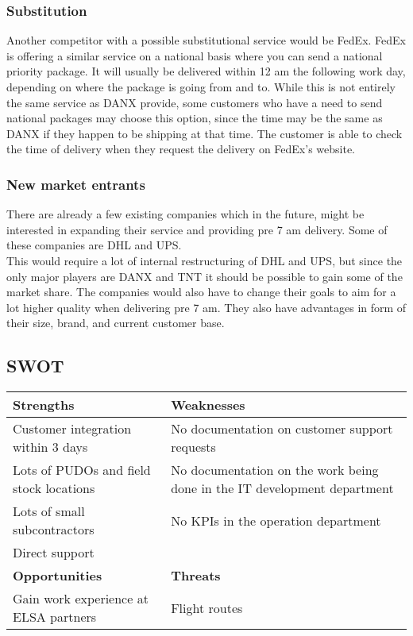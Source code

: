 \subsubsection{Substitution}
Another competitor with a possible substitutional service would be FedEx\cite{webpage004}. FedEx is offering a similar service on a national basis where you can send a national priority package. It will usually be delivered within 12 am the following work day, depending on where the package is going from and to. While this is not entirely the same service as DANX provide, some customers who have a need to send national packages may choose this option, since the time may be the same as DANX if they happen to be shipping at that time. The customer is able to check the time of delivery when they request the delivery on FedEx’s website\cite{webpage011}.

\subsubsection{New market entrants}
There are already a few existing companies which in the future, might be interested in expanding their service and providing pre 7 am delivery. Some of these companies are DHL and UPS.\\
This would require a lot of internal restructuring of DHL and UPS, but since the only major players are DANX and TNT it should be possible to gain some of the market share. The companies would also have to change their goals to aim for a lot higher quality when delivering pre 7 am. They also have advantages in form of their size, brand, and current customer base.

\subsection{SWOT}
\begin{tabular}{| p{} | p{} |}
\hline
\rowcolor{GR}
\textbf{Strengths} & \textbf{Weaknesses} \\ \hline
Customer integration within 3 days \cite{lasse008} & No documentation on customer support requests\cite{gert012} \\ \hline
Lots of PUDOs and field stock locations\cite{img001} & No documentation on the work being done in the IT\cite{lasse007} development department\\ \hline
Lots of small subcontractors\cite{img001}\cite{gert021} & No KPIs in the operation department\cite{gert011} \\ \hline
Direct support\cite{lasse012} & \\ \hline \hline
\rowcolor{GR}
\textbf{Opportunities} & \textbf{Threats} \\ \hline
Gain work experience at ELSA partners \cite{gert010}& Flight routes\cite{gert021} \\ \hline
\end{tabular}
\qquad

